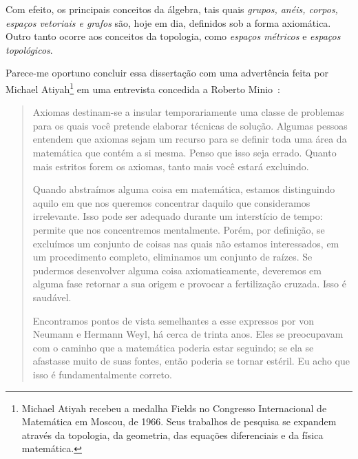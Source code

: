 \documentclass{hipatia}
\begin{document}
Com efeito, os principais conceitos da álgebra, tais quais \emph{grupos, anéis, corpos, espaços vetoriais e grafos} são, hoje em dia, definidos sob a forma axiomática. Outro tanto ocorre aos conceitos da topologia, como \emph{espaços métricos} e \emph{espaços topológicos}.

Parece-me oportuno concluir essa dissertação com uma advertência feita por Michael Atiyah\footnote{Michael Atiyah recebeu a medalha Fields no Congresso Internacional de Matemática em Moscou, de 1966. Seus trabalhos de pesquisa se expandem através da topologia, da geometria, das equações diferenciais e da física matemática.
} em uma entrevista concedida a Roberto Minio~\cite[p. 11]{minio1984}:  
\begin{quote}
Axiomas destinam-se a insular temporariamente uma classe de problemas para os quais você pretende elaborar técnicas de solução. Algumas pessoas entendem que axiomas sejam um recurso para se definir toda uma área da matemática que contém a si mesma. Penso que isso seja errado. Quanto mais estritos forem os axiomas, tanto mais você estará excluindo.

Quando abstraímos alguma coisa em matemática, estamos distinguindo aquilo em que nos queremos concentrar daquilo que consideramos irrelevante. Isso pode ser adequado durante um interstício de tempo: permite que nos concentremos mentalmente. Porém, por definição, se excluímos um conjunto de coisas nas quais não estamos interessados, em um procedimento completo, eliminamos um conjunto de raízes. Se pudermos desenvolver alguma coisa axiomaticamente, deveremos em alguma fase retornar a sua origem e provocar a fertilização cruzada. Isso é saudável.

Encontramos pontos de vista semelhantes a esse expressos por von Neumann e Hermann Weyl, há cerca de trinta anos. Eles se preocupavam com o caminho que a matemática poderia
estar seguindo; se ela se afastasse muito de suas fontes, então
poderia se tornar estéril. Eu acho que isso é fundamentalmente correto.
\end{quote}

\end{document}
